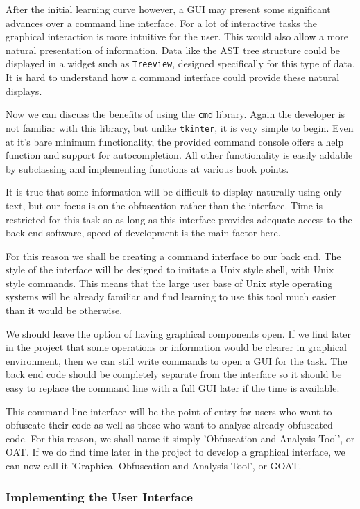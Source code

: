 \documentclass[twoside,a4paper]{report}
\begin{document}
After the initial learning curve however, a GUI may present some significant advances over a command line interface. For a lot of interactive
tasks the graphical interaction is more intuitive for the user. This would also allow a more natural presentation of information. Data like
the AST tree structure could be displayed in a widget such as \texttt{Treeview}, designed specifically for this type of data. It is hard to
understand how a command interface could provide these natural displays.

Now we can discuss the benefits of using the \texttt{cmd} library. Again the developer is not familiar with this library, but unlike
\texttt{tkinter}, it is very simple to begin. Even at it's bare minimum functionality, the provided command console offers a help
function and support for autocompletion. All other functionality is easily addable by subclassing and implementing functions at various
hook points.

It is true that some information will be difficult to display naturally using only text, but our focus is on the obfuscation rather than
the interface. Time is restricted for this task so as long as this interface provides adequate access to the back end software, speed
of development is the main factor here.

For this reason we shall be creating a command interface to our back end. The style of the interface will be designed to imitate a
Unix style shell, with Unix style commands. This means that the large user base of Unix style operating systems will be already familiar
and find learning to use this tool much easier than it would be otherwise.

We should leave the option of having graphical components open. If we find later in the project that some operations or information would
be clearer in graphical environment, then we can still write commands to open a GUI for the task. The back end code should be completely
separate from the interface so it should be easy to replace the command line with a full GUI later if the time is available.

This command line interface will be the point of entry for users who want to obfuscate their code as well as those who want to analyse
already obfuscated code. For this reason, we shall name it simply 'Obfuscation and Analysis Tool', or OAT. If we do find time later in
the project to develop a graphical interface, we can now call it 'Graphical Obfuscation and Analysis Tool', or GOAT.

\subsubsection{Implementing the User Interface}
\end{document}
